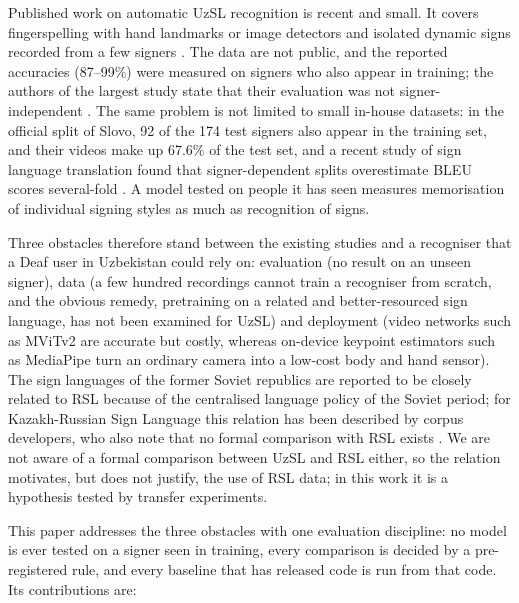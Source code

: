 \documentclass[a4paper,fleqn]{cas-dc}
\begin{document}
Published work on automatic UzSL recognition is recent and small. It covers fingerspelling with hand landmarks or image detectors \cite{2026_jovlieva_webcam_uzbek_fingerspelling, 2024_kayumov_uzsl_latin_angular_signs, 2024_akhmedov_uzsl_dactyl_yolo} and isolated dynamic signs recorded from a few signers \cite{2026_ergashev_cnnlstm_vs_squeezeformer_uzsl, 2025_akkomron_uzslr_isolated_dynamic}. The data are not public, and the reported accuracies (87--99\%) were measured on signers who also appear in training; the authors of the largest study state that their evaluation was not signer-independent \cite{2026_ergashev_cnnlstm_vs_squeezeformer_uzsl}. The same problem is not limited to small in-house datasets: in the official split of Slovo, 92 of the 174 test signers also appear in the training set, and their videos make up 67.6\% of the test set, and a recent study of sign language translation found that signer-dependent splits overestimate BLEU scores several-fold \cite{2026_artiaga_signer_dependence_slt}. A model tested on people it has seen measures memorisation of individual signing styles as much as recognition of signs.

Three obstacles therefore stand between the existing studies and a recogniser that a Deaf user in Uzbekistan could rely on: evaluation (no result on an unseen signer), data (a few hundred recordings cannot train a recogniser from scratch, and the obvious remedy, pretraining on a related and better-resourced sign language, has not been examined for UzSL) and deployment (video networks such as MViTv2 \cite{2022_li_mvitv2} are accurate but costly, whereas on-device keypoint estimators such as MediaPipe \cite{2020_zhang_mediapipe_hands, docs_mediapipe_holistic_landmarker} turn an ordinary camera into a low-cost body and hand sensor). The sign languages of the former Soviet republics are reported to be closely related to RSL because of the centralised language policy of the Soviet period; for Kazakh-Russian Sign Language this relation has been described by corpus developers, who also note that no formal comparison with RSL exists \cite{2020_imashev_krsl_dataset, 2024_imashev_krsl_retrospective}. We are not aware of a formal comparison between UzSL and RSL either, so the relation motivates, but does not justify, the use of RSL data; in this work it is a hypothesis tested by transfer experiments.

This paper addresses the three obstacles with one evaluation discipline: no model is ever tested on a signer seen in training, every comparison is decided by a pre-registered rule, and every baseline that has released code is run from that code. Its contributions are:
\end{document}
